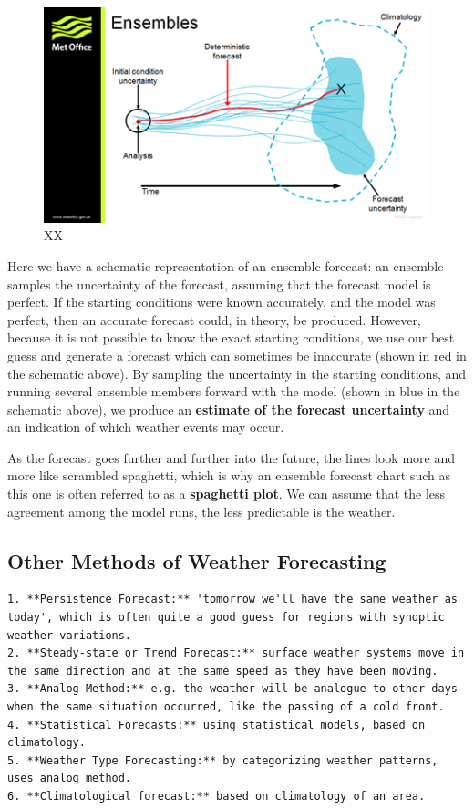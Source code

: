 \documentclass[12pt,oneside]{book}
\begin{document}
\begin{figure}

{\centering \includegraphics[width=0.8\linewidth]{figures/Figure77} 

}

\caption{XX}\label{fig:EnsembleForecasting}
\end{figure}

Here we have a schematic representation of an ensemble forecast: an
ensemble samples the uncertainty of the forecast, assuming that the
forecast model is perfect. If the starting conditions were known
accurately, and the model was perfect, then an accurate forecast could,
in theory, be produced. However, because it is not possible to know the
exact starting conditions, we use our best guess and generate a forecast
which can sometimes be inaccurate (shown in red in the schematic above).
By sampling the uncertainty in the starting conditions, and running
several ensemble members forward with the model (shown in blue in the
schematic above), we produce an \textbf{estimate of the forecast
uncertainty} and an indication of which weather events may occur.

As the forecast goes further and further into the future, the lines look
more and more like scrambled spaghetti, which is why an ensemble
forecast chart such as this one is often referred to as a
\textbf{spaghetti plot}. We can assume that the less agreement among the
model runs, the less predictable is the weather.

\subsection{Other Methods of Weather
Forecasting}\label{other-methods-of-weather-forecasting}

\begin{verbatim}
1. **Persistence Forecast:** 'tomorrow we'll have the same weather as today', which is often quite a good guess for regions with synoptic weather variations. 
2. **Steady-state or Trend Forecast:** surface weather systems move in the same direction and at the same speed as they have been moving.
3. **Analog Method:** e.g. the weather will be analogue to other days when the same situation occurred, like the passing of a cold front.
4. **Statistical Forecasts:** using statistical models, based on climatology.
5. **Weather Type Forecasting:** by categorizing weather patterns, uses analog method.
6. **Climatological forecast:** based on climatology of an area.
\end{verbatim}
\end{document}

